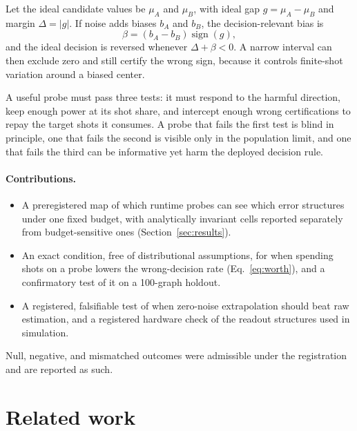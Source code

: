 \documentclass[10pt,twocolumn]{article}
\begin{document}
Let the ideal candidate values be $\mu_A$ and $\mu_B$, with ideal gap
$g=\mu_A-\mu_B$ and margin $\Delta=|g|$. If noise adds biases $b_A$ and $b_B$,
the decision-relevant bias is
\begin{equation}
  \beta=(b_A-b_B)\operatorname{sign}(g),
  \label{eq:beta}
\end{equation}
and the ideal decision is reversed whenever $\Delta+\beta<0$. A narrow interval
can then exclude zero and still certify the wrong sign, because it controls
finite-shot variation around a biased center.

A useful probe must pass three tests: it must respond to the harmful direction,
keep enough power at its shot share, and intercept enough wrong certifications
to repay the target shots it consumes. A probe that fails the first test is
blind in principle, one that fails the second is visible only in the population
limit, and one that fails the third can be informative yet harm the deployed
decision rule.

\paragraph{Contributions.}
\begin{itemize}
\item A preregistered map of which runtime probes can see which error
  structures under one fixed budget, with analytically invariant cells
  reported separately from budget-sensitive ones (Section~\ref{sec:results}).
\item An exact condition, free of distributional assumptions, for when
  spending shots on a probe lowers the wrong-decision rate
  (Eq.~\eqref{eq:worth}), and a confirmatory test of it on a 100-graph holdout.
\item A registered, falsifiable test of when zero-noise extrapolation should
  beat raw estimation, and a registered hardware check of the readout
  structures used in simulation.
\end{itemize}
Null, negative, and mismatched outcomes were admissible under the registration
and are reported as such.

\section{Related work}\label{sec:related}
\end{document}
